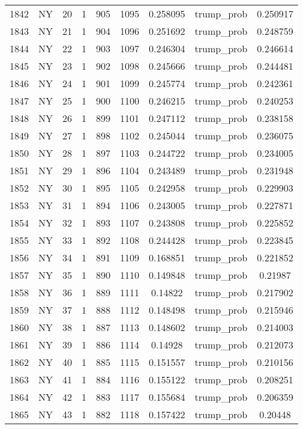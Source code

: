 \documentclass[12pt,a4paper]{article}
\begin{document}
\begin{tabular}{r|cccccccc}
	1842 & NY & 20 & 1 & 905 & 1095 & 0.258095 & trump\_prob & 0.250917 \\
	1843 & NY & 21 & 1 & 904 & 1096 & 0.251692 & trump\_prob & 0.248759 \\
	1844 & NY & 22 & 1 & 903 & 1097 & 0.246304 & trump\_prob & 0.246614 \\
	1845 & NY & 23 & 1 & 902 & 1098 & 0.245666 & trump\_prob & 0.244481 \\
	1846 & NY & 24 & 1 & 901 & 1099 & 0.245774 & trump\_prob & 0.242361 \\
	1847 & NY & 25 & 1 & 900 & 1100 & 0.246215 & trump\_prob & 0.240253 \\
	1848 & NY & 26 & 1 & 899 & 1101 & 0.247112 & trump\_prob & 0.238158 \\
	1849 & NY & 27 & 1 & 898 & 1102 & 0.245044 & trump\_prob & 0.236075 \\
	1850 & NY & 28 & 1 & 897 & 1103 & 0.244722 & trump\_prob & 0.234005 \\
	1851 & NY & 29 & 1 & 896 & 1104 & 0.243489 & trump\_prob & 0.231948 \\
	1852 & NY & 30 & 1 & 895 & 1105 & 0.242958 & trump\_prob & 0.229903 \\
	1853 & NY & 31 & 1 & 894 & 1106 & 0.243005 & trump\_prob & 0.227871 \\
	1854 & NY & 32 & 1 & 893 & 1107 & 0.243808 & trump\_prob & 0.225852 \\
	1855 & NY & 33 & 1 & 892 & 1108 & 0.244428 & trump\_prob & 0.223845 \\
	1856 & NY & 34 & 1 & 891 & 1109 & 0.168851 & trump\_prob & 0.221852 \\
	1857 & NY & 35 & 1 & 890 & 1110 & 0.149848 & trump\_prob & 0.21987 \\
	1858 & NY & 36 & 1 & 889 & 1111 & 0.14822 & trump\_prob & 0.217902 \\
	1859 & NY & 37 & 1 & 888 & 1112 & 0.148498 & trump\_prob & 0.215946 \\
	1860 & NY & 38 & 1 & 887 & 1113 & 0.148602 & trump\_prob & 0.214003 \\
	1861 & NY & 39 & 1 & 886 & 1114 & 0.14928 & trump\_prob & 0.212073 \\
	1862 & NY & 40 & 1 & 885 & 1115 & 0.151557 & trump\_prob & 0.210156 \\
	1863 & NY & 41 & 1 & 884 & 1116 & 0.155122 & trump\_prob & 0.208251 \\
	1864 & NY & 42 & 1 & 883 & 1117 & 0.155684 & trump\_prob & 0.206359 \\
	1865 & NY & 43 & 1 & 882 & 1118 & 0.157422 & trump\_prob & 0.20448 \\

\end{tabular}
\end{document}
